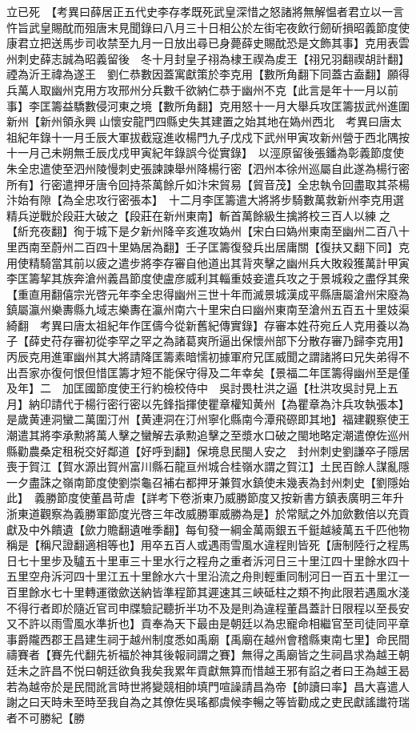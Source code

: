 立已死　【考異曰薛居正五代史李存孝既死武皇深惜之怒諸將無解愠者君立以一言忤旨武皇賜酖而殂唐末見聞錄曰八月三十日相公於左街宅夜飲行劒斫損昭義節度使康君立把送馬步司收禁至九月一日放出尋已身薨薛史賜酖恐是文飾其事】克用表雲州刺史薛志誠為昭義留後　冬十月封皇子祤為棣王禊為䖍王【祤兄羽翻禊胡計翻】禋為沂王禕為遂王　劉仁恭數因蓋寓獻策於李克用【數所角翻下同蓋古盍翻】願得兵萬人取幽州克用方攻邢州分兵數千欲納仁恭于幽州不克【此言是年十一月以前事】李匡籌益驕數侵河東之境【數所角翻】克用怒十一月大舉兵攻匡籌拔武州進圍新州【新州領永興山懷安龍門四縣史失其建置之始其地在媯州西北　考異曰唐太祖紀年錄十一月壬辰大軍拔截寇進收楊門九子戊戍下武州甲寅攻新州營于西北隅按十一月己未朔無壬辰戊戍甲寅紀年錄誤今從實錄】　以涇原留後張鐇為彰義節度使　朱全忠遣使至泗州陵慢刺史張諫諫舉州降楊行密【泗州本徐州巡屬自此遂為楊行密所有】行密遣押牙唐令回持茶萬餘斤如汴宋貿易【貿音茂】全忠執令回盡取其茶楊汴始有隙【為全忠攻行密張本】　十二月李匡籌遣大將將步騎數萬救新州李克用選精兵逆戰於段莊大破之【段莊在新州東南】斬首萬餘級生擒將校三百人以練之【紤充夜翻】徇于城下是夕新州降辛亥進攻媯州【宋白曰媯州東南至幽州二百八十里西南至蔚州二百四十里媯居為翻】壬子匡籌復發兵出居庸關【復扶又翻下同】克用使精騎當其前以疲之遣步將李存審自他道出其背夾擊之幽州兵大敗殺獲萬計甲寅李匡籌挈其族奔滄州義昌節度使盧彦威利其輜重妓妾遣兵攻之于景城殺之盡俘其衆【重直用翻僖宗光啓元年李全忠得幽州三世十年而滅景城漢成平縣唐屬滄州宋廢為鎮屬瀛州樂夀縣九域志樂夀在瀛州南六十里宋白曰幽州東南至滄州五百五十里妓渠綺翻　考異曰唐太祖紀年作匡儔今從新舊紀傳實錄】存審本姓苻宛丘人克用養以為子【薛史苻存審初從李罕之罕之為諸葛爽所逼出保懷州部下分散存審乃歸李克用】丙辰克用進軍幽州其大將請降匡籌素暗懦初據軍府兄匡威聞之謂諸將曰兄失弟得不出吾家亦復何恨但惜匡籌才短不能保守得及二年幸矣【景福二年匡籌得幽州至是僅及年】二　加匡國節度使王行約檢校侍中　吳討畏杜洪之逼【杜洪攻吳討見上五月】納印請代于楊行密行密以先鋒指揮使瞿章權知黄州【為瞿章為汴兵攻執張本】　是歲黄連洞蠻二萬圍汀州【黄連洞在汀州寧化縣南今潭飛磜即其地】福建觀察使王潮遣其將李承勲將萬人擊之蠻解去承勲追擊之至漿水口破之閩地略定潮遣僚佐巡州縣勸農桑定租税交好鄰道【好呼到翻】保境息民閩人安之　封州刺史劉謙卒子隱居喪于賀江【賀水源出賀州富川縣石龍亘州城合桂嶺水謂之賀江】土民百餘人謀亂隱一夕盡誅之嶺南節度使劉崇龜召補右都押牙兼賀水鎮使未幾表為封州刺史【劉隱始此】　義勝節度使董昌苛虐【詳考下卷浙東乃威勝節度又按新書方鎮表廣明三年升浙東道觀察為義勝軍節度光啓三年改威勝軍威勝為是】於常賦之外加歛數倍以充貢獻及中外饋遺【歛力贍翻遺唯季翻】每旬發一綱金萬兩銀五千鋌越綾萬五千匹他物稱是【稱尺證翻適相等也】用卒五百人或遇雨雪風水違程則皆死【唐制陸行之程馬日七十里步及驢五十里車三十里水行之程舟之重者泝河日三十里江四十里餘水四十五里空舟泝河四十里江五十里餘水六十里沿流之舟則輕重同制河日一百五十里江一百里餘水七十里轉運徵歛送納皆準程節其遲速其三峽砥柱之類不拘此限若遇風水淺不得行者即於隨近官司申牒驗記聽折半功不及是則為違程董昌蓋計日限程以至長安又不許以雨雪風水準折也】貢奉為天下最由是朝廷以為忠寵命相繼官至司徒同平章事爵隴西郡王昌建生祠于越州制度悉如禹廟【禹廟在越州會稽縣東南七里】命民間禱賽者【賽先代翻先祈福於神其後報祠謂之賽】無得之禹廟皆之生祠昌求為越王朝廷未之許昌不悦曰朝廷欲負我矣我累年貢獻無算而惜越王邪有諂之者曰王為越王曷若為越帝於是民間訛言時世將變競相帥填門喧譟請昌為帝【帥讀曰率】昌大喜遣人謝之曰天時未至時至我自為之其僚佐吳瑤都虞候李暢之等皆勸成之吏民獻謠䜟符瑞者不可勝紀【勝
